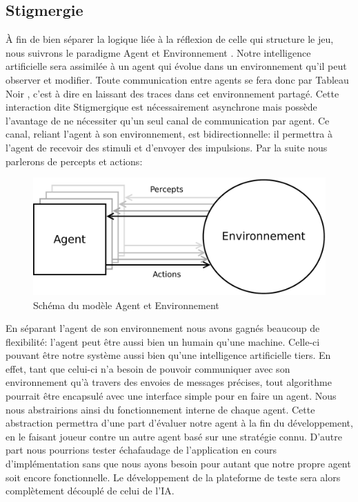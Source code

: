 \subsection{ \og Stigmergie \fg{} }

À fin de bien séparer la logique liée à la réflexion de celle qui structure le jeu, nous suivrons le paradigme \og Agent et Environnement \fg{}. Notre intelligence artificielle sera assimilée à un agent qui évolue dans un environnement qu'il peut observer et modifier. 
Toute communication entre agents se fera donc par \og Tableau Noir \fg{}, c'est à dire en laissant des traces dans cet environnement partagé. Cette interaction dite \og Stigmergique \fg{} est nécessairement asynchrone mais possède l'avantage de ne nécessiter qu'un seul canal de communication par agent.
Ce canal, reliant l'agent à son environnement, est bidirectionnelle: il permettra à l'agent de recevoir des stimuli et d'envoyer des impulsions. Par la suite nous parlerons de \og percepts\fg{} et \og actions\fg{}:

\begin{figure}[H] 
\centering
\includegraphics[width=\textwidth]{files/env/agent_env} 
\caption{Schéma du modèle \og Agent et Environnement \fg{}} 
\label{agent_env}
\end{figure}

En séparant l'agent de son environnement nous avons gagnés beaucoup de flexibilité: l'agent peut être aussi bien un humain qu'une machine. Celle-ci pouvant être notre système aussi bien qu'une intelligence artificielle tiers. 
En effet, tant que celui-ci n'a besoin de pouvoir communiquer avec son environnement qu'à travers des envoies de messages précises, tout algorithme pourrait être encapsulé avec une interface simple pour en faire un agent. Nous nous abstrairions ainsi du fonctionnement interne de chaque agent.
Cette abstraction permettra d'une part d'évaluer notre agent à la fin du développement, en le faisant joueur contre un autre agent basé sur une stratégie connu. D'autre part nous pourrions tester échafaudage de l'application en cours d'implémentation sans que nous ayons besoin pour autant que notre propre agent soit encore fonctionnelle. Le développement de la plateforme de teste sera alors complètement découplé de celui de l'IA.

